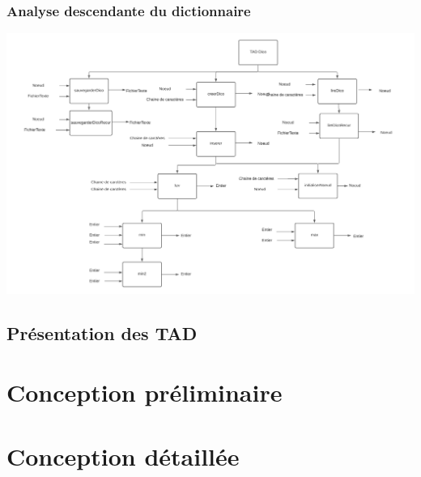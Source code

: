 \documentclass[11pt,a4paper]{article}
\begin{document}
            \subsubsection{Analyse descendante du dictionnaire}
            \includegraphics[scale=0.5]{images/Analyse_Descendante_Dictionnaire.png}
            \clearpage
        \subsection{Présentation des TAD}
    
                
                
                
                \clearpage

    \section{Conception préliminaire}
        

        

        
        \clearpage

    \section{Conception détaillée}
        
        \clearpage
        
        
        \clearpage
        
        
        \clearpage
        
\end{document}
